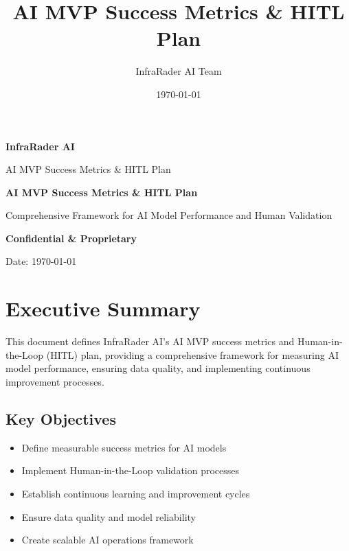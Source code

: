 \documentclass[business]{../templates/infraradar-main}
\title{AI MVP Success Metrics \& HITL Plan}
\author{InfraRader AI Team}
\date{\today}
\begin{document}
\begin{titlepage}
    \centering
    \vspace*{2cm}
    
    {\Huge\bfseries\color{infraradar@primary} InfraRader AI\par}
    \vspace{0.5cm}
    {\Large\color{infraradar@text} AI MVP Success Metrics \& HITL Plan\par}
    \vspace{2cm}
    
    {\huge\bfseries AI MVP Success Metrics \& HITL Plan\par}
    \vspace{1cm}
    
    {\large Comprehensive Framework for AI Model Performance and Human Validation\par}
    \vspace{2cm}
    
    {\large\bfseries\color{infraradar@primary} Confidential \& Proprietary\par}
    {\large Date: \today\par}
    
\end{titlepage}

\tableofcontents
\newpage

\section{Executive Summary}

This document defines InfraRader AI's AI MVP success metrics and Human-in-the-Loop (HITL) plan, providing a comprehensive framework for measuring AI model performance, ensuring data quality, and implementing continuous improvement processes.

\subsection{Key Objectives}
\begin{itemize}
    \item Define measurable success metrics for AI models
    \item Implement Human-in-the-Loop validation processes
    \item Establish continuous learning and improvement cycles
    \item Ensure data quality and model reliability
    \item Create scalable AI operations framework
\end{itemize}
\end{document}

